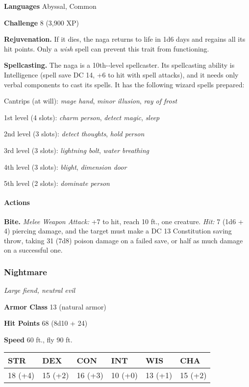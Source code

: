 \documentclass[
]{article}
\begin{document}
\textbf{Languages} Abyssal, Common

\textbf{Challenge} 8 (3,900 XP)

\textbf{Rejuvenation.} If it dies, the naga returns to life in 1d6 days
and regains all its hit points. Only a \emph{wish} spell can prevent
this trait from functioning.

\textbf{Spellcasting.} The naga is a 10th-­‐level spellcaster. Its
spellcasting ability is Intelligence (spell save DC 14, +6 to hit with
spell attacks), and it needs only verbal components to cast its spells.
It has the following wizard spells prepared:

Cantrips (at will): \emph{mage hand}, \emph{minor illusion}, \emph{ray
of frost}

1st level (4 slots): \emph{charm person}, \emph{detect magic},
\emph{sleep}

2nd level (3 slots): \emph{detect thoughts}, \emph{hold person}

3rd level (3 slots): \emph{lightning bolt}, \emph{water breathing}

4th level (3 slots): \emph{blight}, \emph{dimension door}

5th level (2 slots): \emph{dominate person}

\hypertarget{actions-1}{%
\paragraph{Actions}\label{actions-1}}

\textbf{Bite.} \emph{Melee Weapon Attack:} +7 to hit, reach 10 ft., one
creature. \emph{Hit:} 7 (1d6 + 4) piercing damage, and the target must
make a DC 13 Constitution saving throw, taking 31 (7d8) poison damage on
a failed save, or half as much damage on a successful one.

\hypertarget{nightmare}{%
\subsubsection{Nightmare}\label{nightmare}}

\emph{Large fiend, neutral evil}

\textbf{Armor Class} 13 (natural armor)

\textbf{Hit Points} 68 (8d10 + 24)

\textbf{Speed} 60 ft., fly 90 ft.

\begin{longtable}[]{@{}llllll@{}}
\toprule
STR & DEX & CON & INT & WIS & CHA\tabularnewline
\midrule
\endhead
18 (+4) & 15 (+2) & 16 (+3) & 10 (+0) & 13 (+1) & 15 (+2)\tabularnewline
\bottomrule
\end{longtable}
\end{document}
